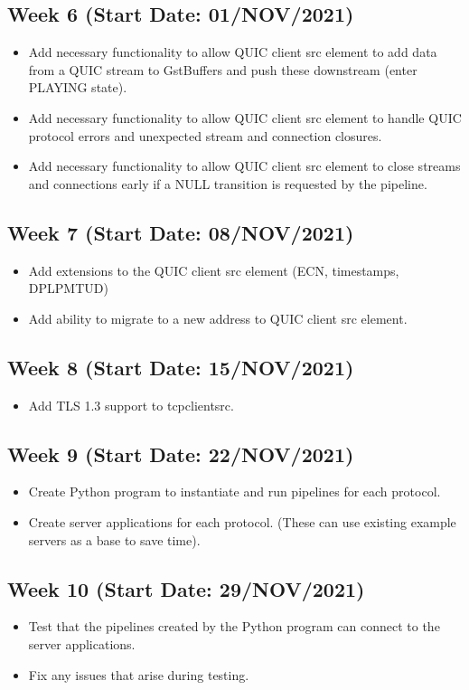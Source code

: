 \documentclass[11pt]{article}
\begin{document}
\subsection{Week 6 (Start Date: 01/NOV/2021)}
\begin{itemize}
    \item Add necessary functionality to allow QUIC client src element to add data from a QUIC stream to GstBuffers and push these downstream (enter PLAYING state).
    \item Add necessary functionality to allow QUIC client src element to handle QUIC protocol errors and unexpected stream and connection closures.
    \item Add necessary functionality to allow QUIC client src element to close streams and connections early if a NULL transition is requested by the pipeline.
\end{itemize}
\subsection{Week 7 (Start Date: 08/NOV/2021)}
\begin{itemize}
    \item Add extensions to the QUIC client src element (ECN, timestamps, DPLPMTUD)
    \item Add ability to migrate to a new address to QUIC client src element.
\end{itemize}
\subsection{Week 8 (Start Date: 15/NOV/2021)}
\begin{itemize}
    \item Add TLS 1.3 support to tcpclientsrc.
\end{itemize}
\subsection{Week 9 (Start Date: 22/NOV/2021)}
\begin{itemize}
    \item Create Python program to instantiate and run pipelines for each protocol.
    \item Create server applications for each protocol. (These can use existing example servers as a base to save time).
\end{itemize}
\subsection{Week 10 (Start Date: 29/NOV/2021)}
\begin{itemize}
    \item Test that the pipelines created by the Python program can connect to the server applications.
    \item Fix any issues that arise during testing.
\end{itemize}
\end{document}

